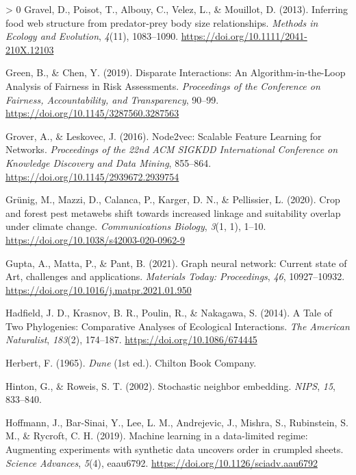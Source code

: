 \documentclass[11pt]{article}
\newlength{\cslhangindent}
\newenvironment{CSLReferences}[3] %
 {%
  \setlength{\parindent}{0pt}
  \ifodd #1 \everypar{\setlength{\hangindent}{\cslhangindent}}\ignorespaces\fi
  \ifnum #2 > 0
  \setlength{\parskip}{#2\baselineskip}
  \fi
 }%
 {}
\begin{document}
\begin{CSLReferences}{1}{0}
\leavevmode\hypertarget{ref-Gravel2013InfFoo}{}%
Gravel, D., Poisot, T., Albouy, C., Velez, L., \& Mouillot, D. (2013).
Inferring food web structure from predator-prey body size relationships.
\emph{Methods in Ecology and Evolution}, \emph{4}(11), 1083--1090.
\url{https://doi.org/10.1111/2041-210X.12103}

\leavevmode\hypertarget{ref-Green2019DisInt}{}%
Green, B., \& Chen, Y. (2019). Disparate Interactions: An
Algorithm-in-the-Loop Analysis of Fairness in Risk Assessments.
\emph{Proceedings of the Conference on Fairness, Accountability, and
Transparency}, 90--99. \url{https://doi.org/10.1145/3287560.3287563}

\leavevmode\hypertarget{ref-Grover2016NodSca}{}%
Grover, A., \& Leskovec, J. (2016). Node2vec: Scalable Feature Learning
for Networks. \emph{Proceedings of the 22nd ACM SIGKDD International
Conference on Knowledge Discovery and Data Mining}, 855--864.
\url{https://doi.org/10.1145/2939672.2939754}

\leavevmode\hypertarget{ref-Grunig2020CroFor}{}%
Grünig, M., Mazzi, D., Calanca, P., Karger, D. N., \& Pellissier, L.
(2020). Crop and forest pest metawebs shift towards increased linkage
and suitability overlap under climate change. \emph{Communications
Biology}, \emph{3}(1, 1), 1--10.
\url{https://doi.org/10.1038/s42003-020-0962-9}

\leavevmode\hypertarget{ref-Gupta2021GraNeu}{}%
Gupta, A., Matta, P., \& Pant, B. (2021). Graph neural network: Current
state of Art, challenges and applications. \emph{Materials Today:
Proceedings}, \emph{46}, 10927--10932.
\url{https://doi.org/10.1016/j.matpr.2021.01.950}

\leavevmode\hypertarget{ref-Hadfield2014TalTwo}{}%
Hadfield, J. D., Krasnov, B. R., Poulin, R., \& Nakagawa, S. (2014). A
Tale of Two Phylogenies: Comparative Analyses of Ecological
Interactions. \emph{The American Naturalist}, \emph{183}(2), 174--187.
\url{https://doi.org/10.1086/674445}

\leavevmode\hypertarget{ref-Herbert1965Dun}{}%
Herbert, F. (1965). \emph{Dune} (1st ed.). Chilton Book Company.

\leavevmode\hypertarget{ref-Hinton2002StoNei}{}%
Hinton, G., \& Roweis, S. T. (2002). Stochastic neighbor embedding.
\emph{NIPS}, \emph{15}, 833--840.

\leavevmode\hypertarget{ref-Hoffmann2019MacLea}{}%
Hoffmann, J., Bar-Sinai, Y., Lee, L. M., Andrejevic, J., Mishra, S.,
Rubinstein, S. M., \& Rycroft, C. H. (2019). Machine learning in a
data-limited regime: Augmenting experiments with synthetic data uncovers
order in crumpled sheets. \emph{Science Advances}, \emph{5}(4),
eaau6792. \url{https://doi.org/10.1126/sciadv.aau6792}


\end{CSLReferences}
\end{document}
